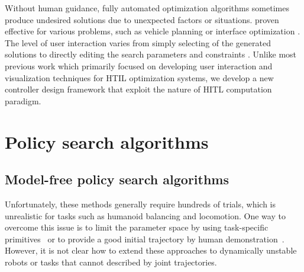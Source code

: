 Without human guidance, fully automated optimization algorithms
sometimes produce undesired solutions due to unexpected factors or
situations.
 proven effective for various problems, such as
vehicle planning \cite{Waters:1984:IVR} or interface optimization
\cite{Quiroz:2007:IEX}.  The level of user interaction
varies from simply selecting of the generated solutions
\cite{Sims:1991:AEC} to directly editing the search parameters and
constraints \cite{Sreevalsan-Nair:2007:HGE}. Unlike
most previous work which primarily focused on developing user
interaction and visualization techniques for HTIL optimization
systems, we develop a new controller design framework that exploit the nature of
HITL computation paradigm.

\section{Policy search algorithms}
\label{sec:related_policy}

\subsection{Model-free policy search algorithms}
Unfortunately, these methods generally require hundreds of
trials, which is unrealistic for tasks such as humanoid balancing and
locomotion.
One way to overcome this issue is to limit the parameter space by using
task-specific primitives~\cite{bib-nakanishi-adaptation} or to provide a
good initial trajectory by human
demonstration~\cite{bib-atkeson-demonstration}.
However, it is not clear how to extend these approaches to dynamically
unstable robots or tasks that cannot described by joint trajectories.

